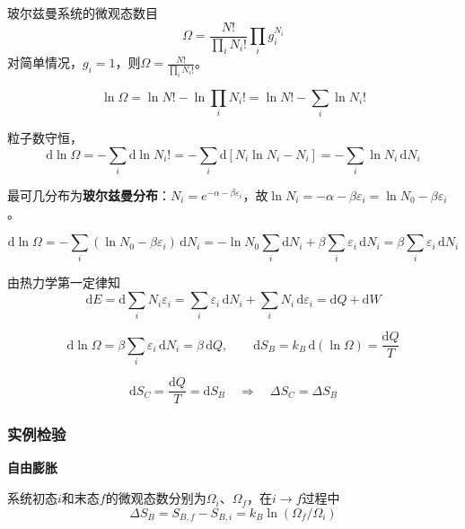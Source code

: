 \documentclass[UTF8]{ctexart}
\theoremstyle{definition}
\begin{document}
玻尔兹曼系统的微观态数目
\begin{equation}
\Omega = \frac{N!}{\prod_i N_i!}\prod_i g_i^{N_i}
\end{equation}
对简单情况，$g_i=1$，则$\displaystyle\Omega = \frac{N!}{\prod_i N_i!}$。

\begin{equation}
\ln\Omega = \ln N! - \ln\prod_i N_i! = \ln N! - \sum_i\ln N_i!
\end{equation}

粒子数守恒，
\begin{equation}
\mathrm{d}\ln\Omega = -\sum_i\mathrm{d}\ln N_i! = -\sum_i\mathrm{d}[N_i\ln N_i - N_i] = -\sum_i\ln N_i\,\mathrm{d}N_i
\end{equation}

最可几分布为\textbf{玻尔兹曼分布}：$N_i = e^{-\alpha-\beta\varepsilon_i}$，故$\ln N_i = -\alpha-\beta\varepsilon_i = \ln N_0 - \beta\varepsilon_i$。

\begin{equation}
\mathrm{d}\ln\Omega = -\sum_i(\ln N_0 - \beta\varepsilon_i)\,\mathrm{d}N_i = -\ln N_0\sum_i\mathrm{d}N_i + \beta\sum_i\varepsilon_i\,\mathrm{d}N_i = \beta\sum_i\varepsilon_i\,\mathrm{d}N_i
\end{equation}

由热力学第一定律知
\begin{equation}
\mathrm{d}E = \mathrm{d}\sum_i N_i\varepsilon_i = \sum_i\varepsilon_i\,\mathrm{d}N_i + \sum_i N_i\,\mathrm{d}\varepsilon_i = \mathrm{d}Q + \mathrm{d}W
\end{equation}

\begin{equation}
\mathrm{d}\ln\Omega = \beta\sum_i\varepsilon_i\,\mathrm{d}N_i = \beta\,\mathrm{d}Q,\qquad
\mathrm{d}S_B = k_B\,\mathrm{d}(\ln\Omega) = \frac{\mathrm{d}Q}{T}
\end{equation}

\begin{equation}
\mathrm{d}S_C = \frac{\mathrm{d}Q}{T} = \mathrm{d}S_B
\quad\Rightarrow\quad
\boxed{\Delta S_C = \Delta S_B}
\end{equation}

\subsubsection*{实例检验}

\textbf{自由膨胀}

系统初态$i$和末态$f$的微观态数分别为$\Omega_i$、$\Omega_f$，在$i\to f$过程中
\begin{equation}
\Delta S_B = S_{B,f} - S_{B,i} = k_B\ln(\Omega_f/\Omega_i)
\end{equation}
\end{document}

